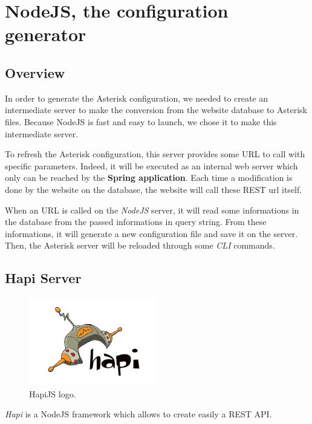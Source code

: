 \chapter{NodeJS, the configuration generator}
\section{Overview}

In order to generate the Asterisk configuration, we needed to create an intermediate server to make the conversion from the website database to Asterisk files. Because NodeJS is fast and easy to launch, we chose it to make this intermediate server. \newline

To refresh the Asterisk configuration, this server provides some URL to call with specific parameters. Indeed, it will be executed as an internal web server which only can be reached by the \textbf{Spring application}. Each time a modification is done by the website on the database, the website will call these REST url itself. \newline

When an URL is called on the \textit{NodeJS} server, it will read some informations in the database from the passed informations in query string. From these informations, it will generate a new configuration file and save it on the server. Then, the Asterisk server will be reloaded through some \textit{CLI} commands.

\section{Hapi Server}

\begin{figure}[!ht]
  \caption{HapiJS logo.}
  \centering
    \includegraphics[width=0.5\textwidth]{img/hapijs}
\end{figure}

\textit{Hapi} is a NodeJS framework which allows to create easily a REST API. 

